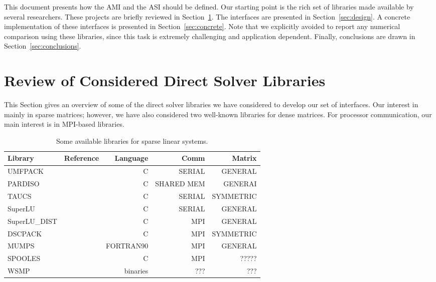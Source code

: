 \documentclass[acmtocl]{acmtrans2m}
\begin{document}
\bigskip

This document presents how the AMI and the ASI should be
defined.  Our starting point is the rich set of libraries made available by
several researchers. These projects are briefly reviewed in
Section~\ref{sec:review}.  The interfaces are presented in
Section~\ref{sec:design}. A concrete implementation of these interfaces is
presented in Section~\ref{sec:concrete}.  Note that we explicitly avoided to
report any numerical comparison using these libraries, since this task
is extremely challenging and application dependent. Finally,
  conclusions are drawn in Section~\ref{sec:conclusions}. 

\section{Review of Considered Direct Solver Libraries}
\label{sec:review}

This Section gives an overview of some of the direct solver libraries
we have considered to develop our set of interfaces.
Our interest in mainly in sparse matrices; however, we have also considered
two well-known libraries for dense matrices. For processor communication, our
main interest is in MPI-based libraries.

\begin{table}
\begin{center}
\begin{tabular}{| l | p{5cm} r r r|}
\hline
Library & Reference & Language & Comm & Matrix\\
\hline
UMFPACK & \cite{umfpack-home-page} & C & SERIAL & GENERAL\\
PARDISO & \cite{oskl:04-etna,sg:04-fgcs} & C & SHARED MEM & GENERAI \\
TAUCS & \cite{irony04parallel,rotkin04design,rozin04locality} & C & SERIAL &
SYMMETRIC \\
SuperLU  & \cite{superlu-manual} & C & SERIAL & GENERAL \\
SuperLU\_DIST  & \cite{superlu-manual} & C & MPI & GENERAL \\
DSCPACK & \cite{dscpack-manual} & C & MPI & SYMMETRIC \\
MUMPS & \cite{mumps-manual} & FORTRAN90 &  MPI  & GENERAL \\
SPOOLES & \cite{ashcraft99spooles} & C & MPI & ????? \\
WSMP &  \cite{gupta01recent} & binaries & ??? & ???    
\end{tabular}
\caption{Some available libraries for sparse linear systems.}
\label{tab:libraries}
\end{center}
\end{table}
\end{document}
